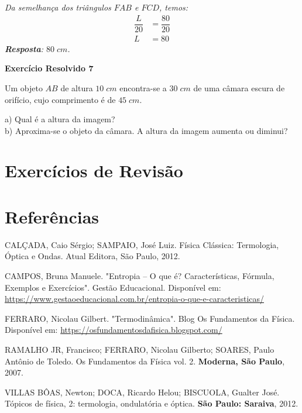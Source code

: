 \documentclass[11pt,twocolumn,oneside]{article}
\newenvironment{resposta*}
  {\bf Resposta:\\ }
  {}
\begin{document}
\begin{resposta*}
{\it Da semelhança dos triângulos $FAB$ e $FCD$, temos:
\begin{align*}
    \dfrac{L}{20} &= \dfrac{80}{20} \\
    L &= 80
\end{align*}
\textbf{Resposta}: $80\;cm$.}
\end{resposta*}

\textbf{Exercício Resolvido 7}


Um objeto $AB$ de altura $10\;cm$ encontra-se a $30\;cm$ de uma câmara escura de orifício, cujo comprimento é de $45\;cm$.


a) Qual é a altura da imagem? \\
b) Aproxima-se o objeto da câmara. A altura da imagem aumenta ou diminui?


\begin{resposta*}
{\it }
\end{resposta*}

\hypertarget{x-exercícios-de-revisão}{\section{Exercícios de Revisão}}

\hypertarget{x-referências}{\section{Referências}}
CALÇADA, Caio Sérgio; SAMPAIO, José Luiz. Física Clássica: Termologia, Óptica e Ondas. Atual Editora, São Paulo, 2012.


CAMPOS, Bruna Manuele. "Entropia – O que é? Características, Fórmula, Exemplos e Exercícios". Gestão Educacional. Disponível em: \href{https://www.gestaoeducacional.com.br/entropia-o-que-e-caracteristicas/}{https://www.gestaoeducacional.com.br/entropia-o-que-e-caracteristicas/}


FERRARO, Nicolau Gilbert. "Termodinâmica". Blog Os Fundamentos da Física. Disponível em: \href{https://osfundamentosdafisica.blogspot.com/}{https://osfundamentosdafisica.blogspot.com/}


RAMALHO JR, Francisco; FERRARO, Nicolau Gilberto; SOARES, Paulo Antônio de Toledo. Os Fundamentos da Física vol. 2. \textbf{Moderna, São Paulo}, 2007.


VILLAS BÔAS, Newton; DOCA, Ricardo Helou; BISCUOLA, Gualter José. Tópicos de física, 2: termologia, ondulatória e óptica. \textbf{São Paulo: Saraiva}, 2012.
\end{document}
